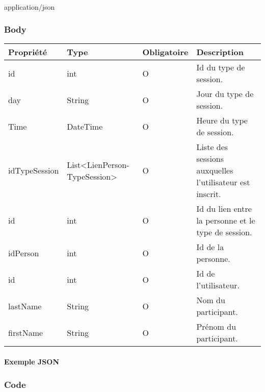 		\paragraph{}
			application/json
	
	\subsubsection{Body}
		\begin{center}
			\begin{tabularx}{\textwidth}{| T{0.2122\textwidth} | S{0.22\textwidth} | S{0.15\textwidth} | S{0.3\textwidth} |}
				\hline
				Propriété & Type & Obligatoire & Description \\
				\hline
				id & int & O & Id du type de session. \\
				\hline
				day & String & O & Jour du type de session. \\
				\hline
				Time & DateTime & O & Heure du type de session. \\
				\hline
				idTypeSession & List<LienPerson- TypeSession> & O & Liste des sessions auxquelles l'utilisateur est inscrit. \\
				\hline
				
				\hline
				
				\hline
				id & int & O & Id du lien entre la personne et le type de session. \\ 
				\hline
				idPerson & int & O & Id de la personne. \\
				\hline
				
				\hline
				
				\hline
				id & int & O & Id de l'utilisateur. \\
				\hline
				lastName & String & O & Nom du participant. \\
				\hline
				firstName & String & O & Prénom du participant. \\
				\hline

			\end{tabularx}
		\end{center}
		
	\newpage
		\paragraph{Exemple JSON}
			\paragraph{}
			
			
			
	\subsubsection{Code}
		\paragraph{}
